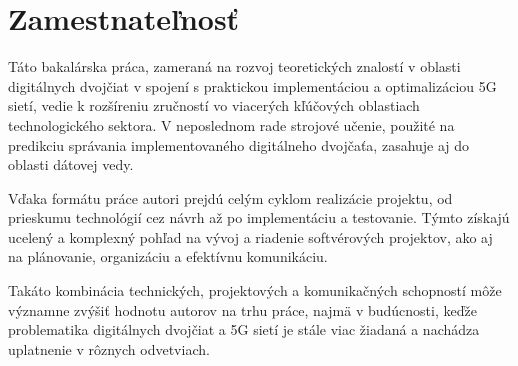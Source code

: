 \section{Zamestnateľnosť}
Táto bakalárska práca, zameraná na rozvoj teoretických znalostí v oblasti digitálnych dvojčiat v spojení s praktickou implementáciou a optimalizáciou 5G sietí, vedie k rozšíreniu zručností vo viacerých kľúčových oblastiach technologického sektora. V neposlednom rade strojové učenie, použité na predikciu správania implementovaného digitálneho dvojčaťa, zasahuje aj do oblasti dátovej vedy.

Vďaka formátu práce autori prejdú celým cyklom realizácie projektu, od prieskumu technológií cez návrh až po implementáciu a testovanie. Týmto získajú ucelený a komplexný pohľad na vývoj a riadenie softvérových projektov, ako aj na plánovanie, organizáciu a efektívnu komunikáciu.

Takáto kombinácia technických, projektových a komunikačných schopností môže významne zvýšiť hodnotu autorov na trhu práce, najmä v budúcnosti, keďže problematika digitálnych dvojčiat a 5G sietí je stále viac žiadaná a nachádza uplatnenie v rôznych odvetviach.